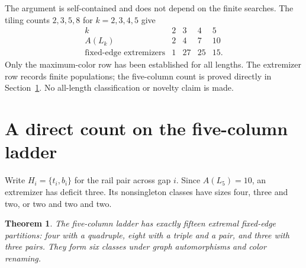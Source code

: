 \documentclass[11pt,letterpaper]{article}
\newtheorem{theorem}{Theorem}
\begin{document}
The argument is self-contained and does not depend on the finite searches.
The tiling counts $2,3,5,8$ for $k=2,3,4,5$ give
\[
\begin{array}{c|rrrr}
 k&2&3&4&5\\ \hline
 A(L_k)&2&4&7&10\\
 \text{fixed-edge extremizers}&1&27&25&15 .
\end{array}
\]
Only the maximum-color row has been established for all lengths.
The extremizer row records finite populations; the five-column count is
proved directly in Section~\ref{sec:l5-count}. No all-length classification
or novelty claim is made.

\newpage
\section{A direct count on the five-column ladder}\label{sec:l5-count}
Write $H_i=\{t_i,b_i\}$ for the rail pair across gap $i$.
Since $A(L_5)=10$, an extremizer has deficit three. Its nonsingleton
classes have sizes four, three and two, or two and two and two.
\begin{theorem}
The five-column ladder has exactly fifteen extremal fixed-edge partitions:
four with a quadruple, eight with a triple and a pair, and three with
three pairs. They form six classes under graph automorphisms and color renaming.
\end{theorem}
\end{document}
